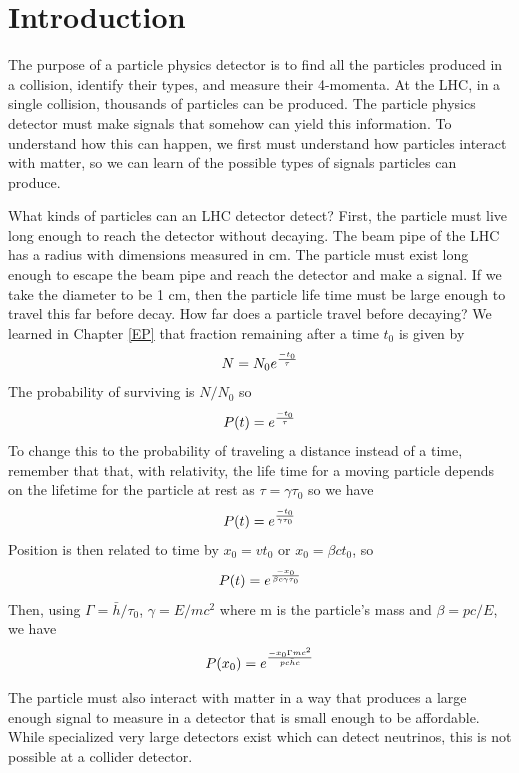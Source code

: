 
\section{Introduction}

The purpose of a particle physics detector is to find all the particles produced
in a collision, identify their types, and measure their 4-momenta.
At the LHC, in a single collision, thousands of particles can be produced.
The particle physics detector must make signals that somehow can yield this information.
To understand how this can happen, we first must understand how particles interact
with matter, so we can learn of the possible types of signals particles can produce.

What kinds of particles can an LHC detector detect?  First, the particle must live long 
enough to reach the detector without decaying.  The beam pipe of the LHC has a 
radius with dimensions measured in cm.  The particle must exist long enough to escape the beam pipe and
reach the detector and make a signal.  If we take the diameter to be 1 cm, then
the particle life time must be large enough to travel this far before decay.
How far does a particle travel before decaying?  We learned in Chapter \ref{EP} that fraction remaining after a time $t_0$ is given by
\begin{equation}
N=N_0 e^{-t_0 \over \tau}
\end{equation}
The probability of surviving is $N / N_0$ so
\begin{equation}
P(t)= e^{-t_0 \over \tau}
\end{equation}
To change this to the probability of traveling a distance instead of a time, remember that that, with relativity, the life time for a moving particle depends on the lifetime for the particle at rest as $\tau = \gamma \tau_0$ so we have
 \begin{equation}
P(t)=e^{-t_0 \over {\gamma \tau_0}}
\end{equation}
Position is then related to time by $x_0=vt_0$ or $x_0=\beta c t_0$, so
\begin{equation}
P(t)=e^{-x_0 \over {\beta c \gamma \tau_0}}
\end{equation}
Then, using
$\Gamma=\bar{h}/\tau_0$, $\gamma=E/mc^2$ where m is the particle's mass 
and $\beta=pc/E$, we have
\begin{equation}
P(x_0)=e^{{-x_0\Gamma mc^2}\over{pc\bar{h}c}}
\end{equation}

The particle must also interact  with matter in a way that produces a large enough signal to measure in a detector that is small enough to be affordable.  While specialized very large detectors exist which can detect neutrinos, this is not possible at a collider detector.

